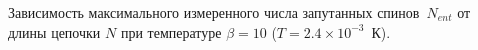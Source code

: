Зависимость максимального измеренного числа запутанных спинов~$N_{ent}$ от длины цепочки $N$ при температуре $\beta = 10$ ($T = 2.4\times 10^{-3}$~К).
